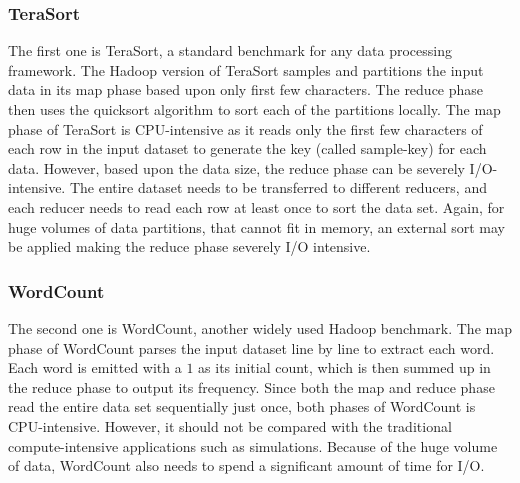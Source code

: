 \documentclass[journal]{IEEEtran}
\begin{document}
\subsubsection{TeraSort}
The first one is TeraSort, a standard benchmark for any data processing framework. The Hadoop version of TeraSort samples and partitions the input data in its map phase based upon only first few characters. The reduce phase then uses the quicksort algorithm to sort each of the partitions locally. 
The map phase of TeraSort is CPU-intensive as it reads only the first few characters of each row in the input dataset to generate the key (called sample-key) for each data. However, based upon the data size, the reduce phase can be severely I/O-intensive. The entire dataset needs to be transferred to different reducers, and each reducer needs to read each row at least once to sort the data set. Again, for huge volumes of data partitions, that cannot fit in memory, an external sort may be applied making the reduce phase severely I/O intensive.  

\subsubsection{WordCount}
The second one is WordCount, another widely used Hadoop benchmark. The map phase of WordCount parses the input dataset line by line to extract each word. Each word is emitted with a $1$ as its initial count, which is then summed up in the reduce phase to output its  frequency. 
Since both the map and reduce phase read the entire data set sequentially just once, both phases of WordCount is CPU-intensive. However, it should not be compared with the traditional compute-intensive applications such as simulations. Because of the huge volume of data, WordCount also needs to spend a significant amount of time for I/O.
\end{document}
